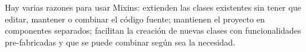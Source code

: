 Hay varias razones para usar Mixins: extienden las clases existentes sin tener que editar, mantener o combinar el código fuente; mantienen el proyecto en componentes separados; facilitan la creación de nuevas clases con funcionalidades pre-fabricadas y que se puede combinar según sea la necesidad.\cite{Mixins}







